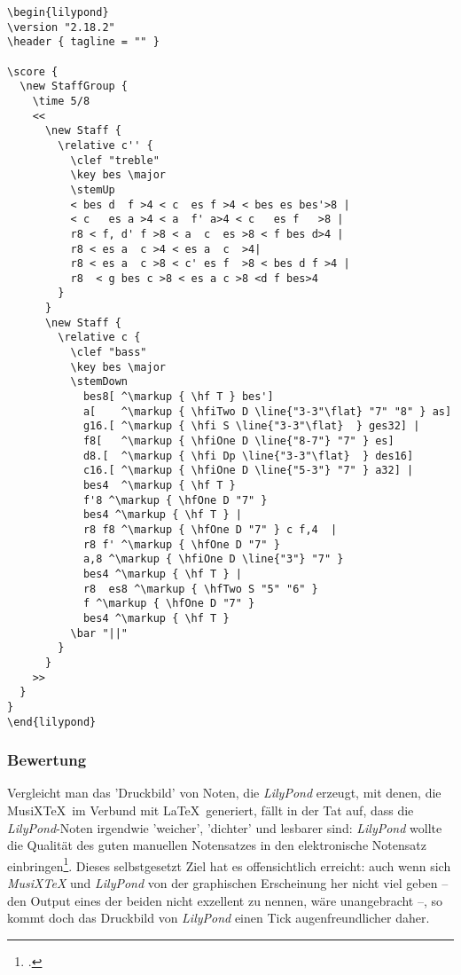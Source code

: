 \begin{verbatim}
\begin{lilypond}
\version "2.18.2"
\header { tagline = "" }

\score {
  \new StaffGroup {
    \time 5/8
    <<
      \new Staff {
        \relative c'' {
          \clef "treble"
          \key bes \major  
          \stemUp
          < bes d  f >4 < c  es f >4 < bes es bes'>8 |
          < c   es a >4 < a  f' a>4 < c   es f   >8 |         
          r8 < f, d' f >8 < a  c  es >8 < f bes d>4 |
          r8 < es a  c >4 < es a  c  >4|
          r8 < es a  c >8 < c' es f  >8 < bes d f >4 |
          r8  < g bes c >8 < es a c >8 <d f bes>4
        }   
      }
      \new Staff {
        \relative c { 
          \clef "bass"
          \key bes \major  
          \stemDown
            bes8[ ^\markup { \hf T } bes']
            a[    ^\markup { \hfiTwo D \line{"3-3"\flat} "7" "8" } as] 
            g16.[ ^\markup { \hfi S \line{"3-3"\flat}  } ges32] |
            f8[   ^\markup { \hfiOne D \line{"8-7"} "7" } es] 
            d8.[  ^\markup { \hfi Dp \line{"3-3"\flat}  } des16] 
            c16.[ ^\markup { \hfiOne D \line{"5-3"} "7" } a32] | 
            bes4  ^\markup { \hf T } 
            f'8 ^\markup { \hfOne D "7" } 
            bes4 ^\markup { \hf T } |
            r8 f8 ^\markup { \hfOne D "7" } c f,4  | 
            r8 f' ^\markup { \hfOne D "7" } 
            a,8 ^\markup { \hfiOne D \line{"3"} "7" } 
            bes4 ^\markup { \hf T } | 
            r8  es8 ^\markup { \hfTwo S "5" "6" } 
            f ^\markup { \hfOne D "7" } 
            bes4 ^\markup { \hf T }
          \bar "||"
        }   
      }
    >>
  }
}
\end{lilypond}
\end{verbatim}

\subsubsection{Bewertung}

Vergleicht man das 'Druckbild' von Noten, die \textit{LilyPond} erzeugt, mit
denen, die MusiX\TeX\ im Verbund mit \LaTeX\ generiert, fällt in der Tat auf,
dass die \textit{LilyPond}-Noten irgendwie 'weicher', 'dichter' und lesbarer
sind: \textit{LilyPond} wollte die Qualität des guten manuellen Notensatzes in
den elektronische Notensatz einbringen\footcite[vgl.][8ff]{LilyPond2018d}.
Dieses selbstgesetzt Ziel hat es offensichtlich erreicht: auch wenn sich
\textit{MusiX\TeX} und \textit{LilyPond} von der graphischen Erscheinung her
nicht viel geben -- den Output eines der beiden nicht exzellent zu nennen, wäre
unangebracht --, so kommt doch das Druckbild von \textit{LilyPond} einen Tick
augenfreundlicher daher.

